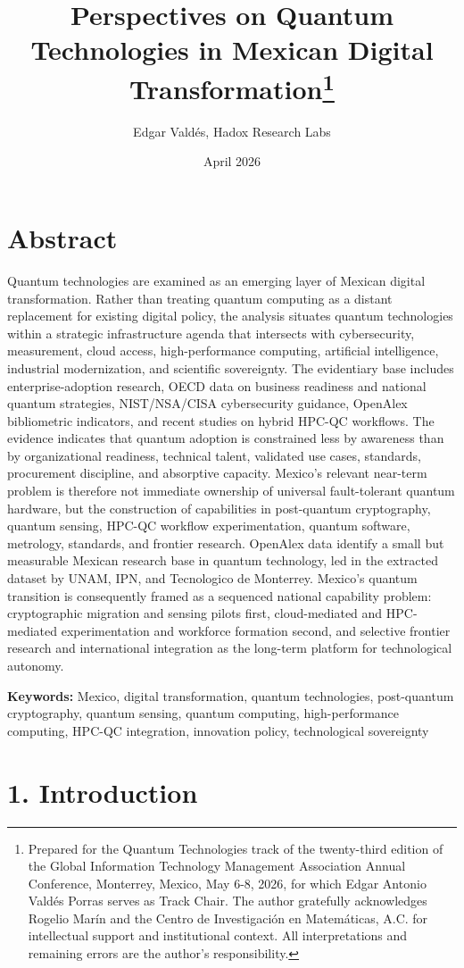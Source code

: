 \documentclass[
  11pt,
  letterpaper,
]{article}
\title{Perspectives on Quantum Technologies in Mexican Digital
Transformation\thanks{Prepared for the Quantum Technologies track of the
twenty-third edition of the Global Information Technology Management
Association Annual Conference, Monterrey, Mexico, May 6-8, 2026, for
which Edgar Antonio Valdés Porras serves as Track Chair. The author
gratefully acknowledges Rogelio Marín and the Centro de Investigación en
Matemáticas, A.C. for intellectual support and institutional context.
All interpretations and remaining errors are the author's
responsibility.}}
\author{Edgar Valdés, Hadox Research Labs}
\date{April 2026}
\begin{document}
\maketitle

\section{Abstract}\label{abstract}

Quantum technologies are examined as an emerging layer of Mexican
digital transformation. Rather than treating quantum computing as a
distant replacement for existing digital policy, the analysis situates
quantum technologies within a strategic infrastructure agenda that
intersects with cybersecurity, measurement, cloud access,
high-performance computing, artificial intelligence, industrial
modernization, and scientific sovereignty. The evidentiary base includes
enterprise-adoption research, OECD data on business readiness and
national quantum strategies, NIST/NSA/CISA cybersecurity guidance,
OpenAlex bibliometric indicators, and recent studies on hybrid HPC-QC
workflows. The evidence indicates that quantum adoption is constrained
less by awareness than by organizational readiness, technical talent,
validated use cases, standards, procurement discipline, and absorptive
capacity. Mexico's relevant near-term problem is therefore not immediate
ownership of universal fault-tolerant quantum hardware, but the
construction of capabilities in post-quantum cryptography, quantum
sensing, HPC-QC workflow experimentation, quantum software, metrology,
standards, and frontier research. OpenAlex data identify a small but
measurable Mexican research base in quantum technology, led in the
extracted dataset by UNAM, IPN, and Tecnologico de Monterrey. Mexico's
quantum transition is consequently framed as a sequenced national
capability problem: cryptographic migration and sensing pilots first,
cloud-mediated and HPC-mediated experimentation and workforce formation
second, and selective frontier research and international integration as
the long-term platform for technological autonomy.

\textbf{Keywords:} Mexico, digital transformation, quantum technologies,
post-quantum cryptography, quantum sensing, quantum computing,
high-performance computing, HPC-QC integration, innovation policy,
technological sovereignty

\section{1. Introduction}\label{introduction}
\end{document}
